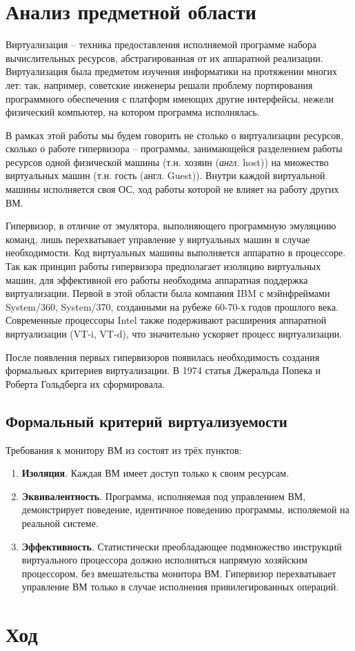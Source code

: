 \documentclass[a4paper,12pt]{extarticle}
\begin{document}
	
	\section{Анализ предметной области}
	Виртуализация – техника предоставления исполняемой программе набора вычислительных ресурсов, абстрагированная от их аппаратной реализации. Виртуализация была предметом изучения информатики на протяжении многих лет: так, например, советские инженеры решали проблему портирования программного обеспечения с платформ имеющих другие интерфейсы, нежели физический компьютер, на котором программа исполнялась.\par
	В рамках этой работы мы будем говорить не столько о виртуализации ресурсов, сколько о работе гипервизора – программы, занимающейся разделением работы ресурсов одной физической машины (т.н. хозяин (\textit{англ.} host)) на множество виртуальных машин (т.н. гость (англ. Guest)). Внутри каждой виртуальной машины исполняется своя ОС, ход работы которой не влияет на работу других ВМ.\par
	Гипервизор, в отличие от эмулятора, выполняющего программную эмуляциию команд, лишь перехватывает управление у виртуальных машин в случае необходимости. Код виртуальных машины выполняется аппаратно в процессоре. Так как принцип работы гипервизора предполагает изоляцию виртуальных машин, для эффективной его работы необходима аппаратная поддержка виртуализации. Первой в этой области была компания IBM с мэйнфреймами System/360, System/370, созданными на рубеже 60-70-х годов прошлого века. Современные процессоры Intel также подерживают расширения аппаратной виртуализации (VT-i, VT-d), что значительно ускоряет процесс виртуализации.\par
	После появления первых гипервизоров появилась необходимость создания формальных критериев виртуализации. В 1974 статья Джеральда Попека и Роберта Гольдберга их сформировала.\par
	\pagebreak
	\subsection{Формальный критерий виртуализуемости}
	Требования к монитору ВМ из состоят из трёх пунктов:
	\begin{enumerate}
		\item \textbf{Изоляция}. Каждая ВМ имеет доступ только к своим ресурсам.
		\item \textbf{Эквивалентность}. Программа, исполняемая под управлением ВМ, демонстрирует поведение, идентичное поведению программы, исполяемой на реальной системе.
		\item \textbf{Эффективность}. Статистически преобладающее подмножество инструкций виртуального процессора должно исполняться напрямую хозяйским процессором, без вмешательства монитора ВМ. Гипервизор перехватывает управление ВМ только в случае исполнения привилегированных операций.
	\end{enumerate}
	\section{Ход}

\end{document}
